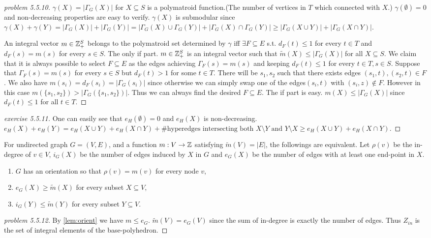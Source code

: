 \documentclass[12pt]{article}
\DeclareRobustCommand{\mybox}[2][gray!20]{%
\begin{tcolorbox}[   %
        breakable,
        left=0pt,
        right=0pt,
        top=0pt,
        bottom=0pt,
        colback=#1,
        colframe=#1,
        width=\dimexpr\textwidth\relax, 
        enlarge left by=0mm,
        boxsep=5pt,
        arc=0pt,outer arc=0pt,
        ]
        #2
\end{tcolorbox}
}
\begin{document}
\begin{proof}[problem 5.5.10]
    $\gamma(X)=|\Gamma_G(X)|$ for $X\subseteq S$ is a polymatroid function.(The number of vertices in $T$ which connected with $X$.) $\gamma(\emptyset)=0$ and non-decreasing properties are easy to verify. $\gamma(X)$ is submodular since $\gamma(X)+\gamma(Y)=|\Gamma_G(X)|+|\Gamma_G(Y)|=|\Gamma_G(X)\cup \Gamma_G(Y)|+|\Gamma_G(X)\cap\Gamma_G(Y)|\geq |\Gamma_G(X\cup Y)|+|\Gamma_G(X\cap Y)|$.

    An integral vector $m\in \Z_+^S$ belongs to the polymatroid set determined by $\gamma$ iff $\exists F\subseteq E$ s.t. $d_F(t)\leq 1$ for every $t\in T$ and $d_F(s)=m(s)$ for every $s\in S$. 
    The only if part. $m\in \Z_+^S$ is an integral vector such that $\widetilde{m}(X)\leq |\Gamma_G(X)|$ for all $X\subseteq S$. We claim that it is always possible to select $F\subseteq E$ as the edges achieving $\Gamma_F(s)=m(s)$ and keeping $d_F(t)\leq 1$ for every $t\in T,s\in S$. Suppose that $\Gamma_F(s)=m(s)$ for every $s\in S$ but $d_F(t)> 1$ for some $t\in T$. There will be $s_1,s_2$ such that there exists edges $(s_1,t),(s_2,t)\in F$. We also have $m(s_i)=d_F(s_i)=|\Gamma_G(s_i)|$ since otherwise we can simply swap one of the edges$(s_i,t)$ with $(s_i,z)\notin F$. However in this case $m(\{s_1,s_2\})>|\Gamma_G(\{s_1,s_2\})|$. Thus we can always find the desired $F\subseteq E$.
    The if part is easy. $m(X)\leq |\Gamma_G(X)|$ since $d_F(t)\leq 1$ for all $t\in T$.
\end{proof}

\begin{proof}[exercise 5.5.11]
    One can easily see that $e_H(\emptyset)=0$ and $e_H(X)$ is non-decreasing.
$e_H(X)+e_H(Y)=e_H(X\cup Y)+e_H(X\cap Y)+\text{\# hyperedges intersecting both $X\setminus Y$ and $Y\setminus X$} \geq e_H(X\cup Y)+e_H(X\cap Y)$.
\end{proof}

\mybox[green!20]{
    \begin{theorem}[Orientation lemma, theorem 2.3.2 in the book]\label{lem:orient}
    For undirected graph $G=(V,E)$, and a function $m:V\to \Z$ satisfying $\widetilde{m}(V)=|E|$, the followings are equivalent. Let $\rho(v)$ be the in-degree of $v\in V$, $i_G(X)$ be the number of edges induced by $X$ in $G$ and $e_G(X)$ be the number of edges with at least one end-point in $X$.
    \begin{enumerate}
        \item $G$ has an orientation so that $\rho(v)=m(v)$ for every node $v$,
        \item $e_G(X)\geq \widetilde{m}(X)$ for every subset $X\subseteq V$,
        \item $i_G(Y)\leq \widetilde{m}(Y)$ for every subset $Y\subseteq V$.
    \end{enumerate}
    \end{theorem}
}
\begin{proof}[problem 5.5.12]
    By \autoref{lem:orient} we have $m\leq e_G$. $\widetilde{m}(V)=e_G(V)$ since the sum of in-degree is exactly the number of edges. Thus $Z_{in}$ is the set of integral elements of the base-polyhedron.
\end{proof}
\end{document}
